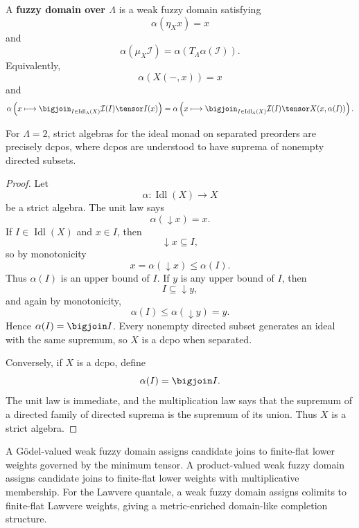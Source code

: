\begin{definition}
\label{def:fuzzy-domain-posetal}
A \textbf{fuzzy domain over \(\Lambda\)} is a weak fuzzy domain satisfying
\[
    \alpha(\eta_X x)=x
\]
and
\[
    \alpha(\mu_X\mathcal I)=\alpha(T_\Lambda\alpha(\mathcal I)).
\]
Equivalently,
\[
    \alpha(X(-,x))=x
\]
and
\[
\alpha\left(
    x\longmapsto
    \bigjoin_{I\in\operatorname{Idl}_\Lambda(X)}
    \mathcal I(I)\tensor I(x)
\right)
=
\alpha\left(
    x\longmapsto
    \bigjoin_{I\in\operatorname{Idl}_\Lambda(X)}
    \mathcal I(I)\tensor X(x,\alpha(I))
\right).
\]
\end{definition}

\begin{theorem}
\label{thm:crisp-algebras-are-dcpos}
For \(\Lambda=2\), strict algebras for the ideal monad on separated preorders are
precisely dcpos, where dcpos are understood to have suprema of nonempty directed
subsets.
\end{theorem}

\begin{proof}
Let
\[
    \alpha:\operatorname{Idl}(X)\to X
\]
be a strict algebra.  The unit law says
\[
    \alpha(\downarrow x)=x.
\]
If \(I\in\operatorname{Idl}(X)\) and \(x\in I\), then
\[
    \downarrow x\subseteq I,
\]
so by monotonicity
\[
    x=\alpha(\downarrow x)\leq \alpha(I).
\]
Thus \(\alpha(I)\) is an upper bound of \(I\).  If \(y\) is any upper bound of
\(I\), then
\[
    I\subseteq\downarrow y,
\]
and again by monotonicity,
\[
    \alpha(I)\leq\alpha(\downarrow y)=y.
\]
Hence \(\alpha(I)=\bigjoin I\).  Every nonempty directed subset generates an ideal
with the same supremum, so \(X\) is a dcpo when separated.

Conversely, if \(X\) is a dcpo, define
\[
    \alpha(I)=\bigjoin I.
\]
The unit law is immediate, and the multiplication law says that the supremum of a
directed family of directed suprema is the supremum of its union.  Thus \(X\) is a
strict algebra.
\end{proof}

\begin{example}
\label{ex:weak-fuzzy-domain-standard}
A G\"odel-valued weak fuzzy domain assigns candidate joins to finite-flat lower
weights governed by the minimum tensor.  A product-valued weak fuzzy domain assigns
candidate joins to finite-flat lower weights with multiplicative membership.  For
the Lawvere quantale, a weak fuzzy domain assigns colimits to finite-flat Lawvere
weights, giving a metric-enriched domain-like completion structure.
\end{example}

